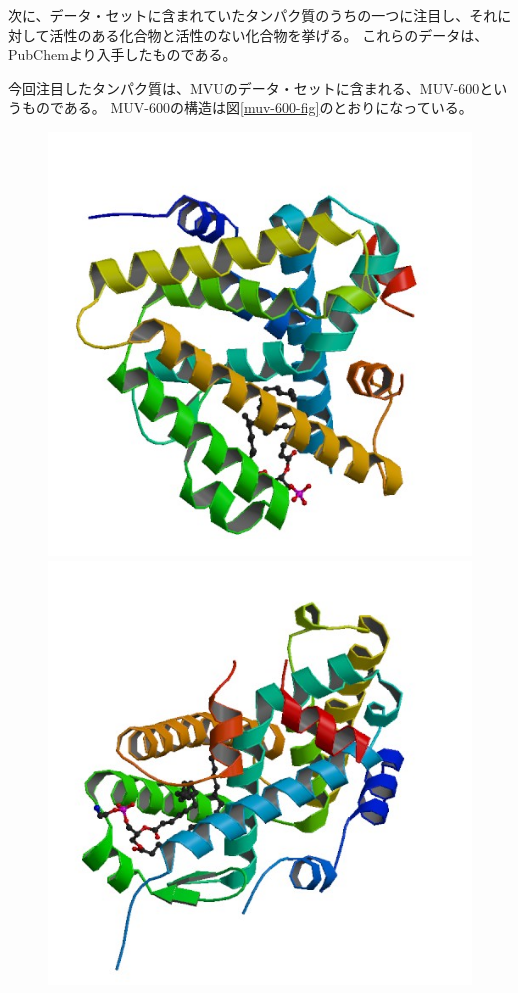 \documentclass[a4j,11pt]{jarticle}
\begin{document}
次に、データ・セットに含まれていたタンパク質のうちの一つに注目し、それに対して活性のある化合物と活性のない化合物を挙げる。
これらのデータは、PubChem\cite{MUV-600}より入手したものである。

今回注目したタンパク質は、MVUのデータ・セットに含まれる、MUV-600というものである。
MUV-600の構造は図\ref{muv-600-fig}のとおりになっている。

\begin{figure}[H]
	\begin{minipage}{0.5\hsize}
		\begin{center}
			\includegraphics[width=12cm, bb=0 0 500 500]{../pictures/MUV-600/1.jpg}
		\end{center}
	\end{minipage}
	\begin{minipage}{0.5\hsize}
		\begin{center}
			\includegraphics[width=12cm, bb=0 0 500 500]{../pictures/MUV-600/2.jpg}

\end{center}
\end{minipage}
\end{figure}
\end{document}
